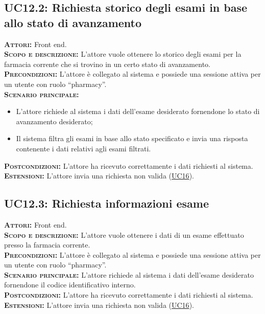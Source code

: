 \subsection{UC12.2: Richiesta storico degli esami in base allo stato di avanzamento}
\label{sec:UC122}
\textsc{\textbf{Attori:}} Front end.\\
\textsc{\textbf{Scopo e descrizione:}} L'attore vuole ottenere lo storico degli esami per la farmacia corrente che si trovino in un certo stato di avanzamento.\\
\textsc{\textsc{\textbf{Precondizioni:}}} L'attore è collegato al sistema e possiede una sessione attiva per un utente con ruolo ``pharmacy''.\\
\textsc{\textsc{\textbf{Scenario principale:}}} 
\begin{itemize}
    \item L'attore richiede al sistema i dati dell'esame desiderato fornendone lo stato di avanzamento desiderato;
    \item Il sistema filtra gli esami in base allo stato specificato e invia una risposta contenente i dati relativi agli esami filtrati.
\end{itemize} 
\textsc{\textbf{Postcondizioni:}} L'attore ha ricevuto correttamente i dati richiesti al sistema.\\
\textsc{\textbf{Estensioni:}} L'attore invia una richiesta non valida (\hyperref[sec:UC16]{UC16}).

\subsection{UC12.3: Richiesta informazioni esame}
\label{sec:UC123}
\textsc{\textbf{Attori:}} Front end.\\
\textsc{\textbf{Scopo e descrizione:}} L'attore vuole ottenere i dati di un esame  effettuato presso la farmacia corrente.\\
\textsc{\textsc{\textbf{Precondizioni:}}} L'attore è collegato al sistema e possiede una sessione attiva per un utente con ruolo ``pharmacy''.\\
\textsc{\textbf{Scenario principale:}} L'attore richiede al sistema i dati dell'esame desiderato fornendone il codice identificativo interno.\\
\textsc{\textbf{Postcondizioni:}} L'attore ha ricevuto correttamente i dati richiesti al sistema.\\
\textsc{\textbf{Estensioni:}} L'attore invia una richiesta non valida (\hyperref[sec:UC16]{UC16}).

